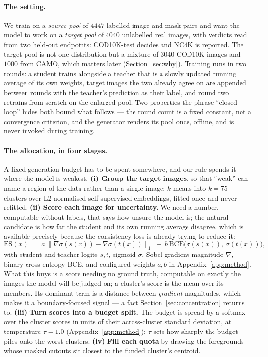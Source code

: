 \documentclass{article}
\newcommand{\atemp}{\tau}
\begin{document}
\paragraph{The setting.} We train on a \emph{source pool} of $4447$ labelled image and mask pairs
and want the model to work on a \emph{target pool} of $4040$ unlabelled real images, with verdicts
read from two held-out endpoints: COD10K-test decides and NC4K is reported. The target pool is not
one distribution but a mixture of $3040$ COD10K images and $1000$ from CAMO, which matters later
(Section~\ref{sec:why}). Training runs in two rounds: a student trains alongside a teacher that is a slowly updated running
average of its own weights, target images the two already agree on are appended between rounds with
the teacher's prediction as their label, and round two retrains from scratch on the enlarged pool.
Two properties the phrase ``closed loop'' hides both bound what follows --- the round count is a
fixed constant, not a convergence criterion, and the generator renders its pool once, offline, and
is never invoked during training.

\paragraph{The allocation, in four stages.} A fixed generation budget has to be spent somewhere, and
our rule spends it where the model is weakest. \textbf{(i) Group the target images}, so that
``weak'' can name a region of the data rather than a single image: $k$-means into $k = 75$ clusters
over L2-normalised self-supervised embeddings, fitted once and never refitted. \textbf{(ii) Score
each image for uncertainty.} We need a number, computable without labels, that says how unsure the
model is; the natural candidate is how far the student and its own running average disagree, which
is available precisely because the consistency loss is already trying to reduce it:
\begin{equation}
\mathrm{ES}(x) \;=\; a \,\big\| \nabla \sigma(s(x)) - \nabla \sigma(t(x)) \big\|_{1}
\;+\; b \, \mathrm{BCE}\big( \sigma(s(x)),\, \sigma(t(x)) \big),
\label{eq:es}
\end{equation}
with student and teacher logits $s,t$, sigmoid $\sigma$, Sobel gradient magnitude $\nabla$, binary
cross-entropy BCE, and
configured weights $a, b$ in Appendix~\ref{app:method}. What this buys is a score needing no ground
truth, computable on exactly the images the model will be judged on; a cluster's score is the mean
over its members. Its dominant term is a distance between \emph{gradient} magnitudes, which makes it
a boundary-focused signal --- a fact Section~\ref{sec:concentration} returns to. \textbf{(iii) Turn scores into a budget split.} The
budget is spread by a softmax over the cluster scores in units of their across-cluster standard
deviation, at temperature $\atemp = 1.0$ (Appendix~\ref{app:method}); $\atemp$ sets how sharply the
budget piles onto the worst clusters.
\textbf{(iv) Fill each quota} by drawing the foregrounds whose masked cutouts sit closest to the
funded cluster's centroid.
\end{document}
